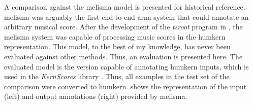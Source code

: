 
A comparison against the \gls{melisma} model is presented
for historical reference. \gls{melisma} was arguably the
first end-to-end \gls{arna} system that could annotate an
arbitrary musical score. After the development of the
\emph{tsroot} program in \textcite{sapp2009tsroot}, the
\gls{melisma} system was capable of processing music scores
in the \gls{humkern} representation. This model, to the best
of my knowledge, has never been evaluated against other
methods. Thus, an evaluation is presented here. The
evaluated model is the version capable of annotating
\gls{humkern} inputs, which is used in the \emph{KernScores}
library \parencite{sapp2005online}. Thus, all examples in
the test set of the comparison were converted to
\gls{humkern}.  shows the
representation of the input (left) and output annotations
(right) provided by \gls{melisma}.

